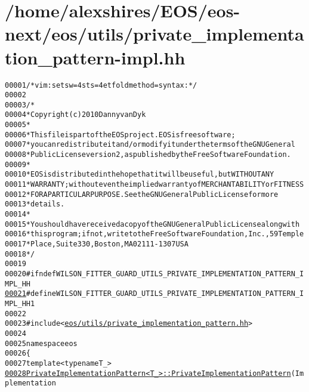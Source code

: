 \hypertarget{private__implementation__pattern-impl_8hh_source}{
\section{/home/alexshires/EOS/eos-\/next/eos/utils/private\_\-implementation\_\-pattern-\/impl.hh}
}


\begin{footnotesize}\begin{alltt}
00001 \textcolor{comment}{/* vim: set sw=4 sts=4 et foldmethod=syntax : */}
00002 
00003 \textcolor{comment}{/*}
00004 \textcolor{comment}{ * Copyright (c) 2010 Danny van Dyk}
00005 \textcolor{comment}{ *}
00006 \textcolor{comment}{ * This file is part of the EOS project. EOS is free software;}
00007 \textcolor{comment}{ * you can redistribute it and/or modify it under the terms of the GNU General}
00008 \textcolor{comment}{ * Public License version 2, as published by the Free Software Foundation.}
00009 \textcolor{comment}{ *}
00010 \textcolor{comment}{ * EOS is distributed in the hope that it will be useful, but WITHOUT ANY}
00011 \textcolor{comment}{ * WARRANTY; without even the implied warranty of MERCHANTABILITY or FITNESS}
00012 \textcolor{comment}{ * FOR A PARTICULAR PURPOSE.  See the GNU General Public License for more}
00013 \textcolor{comment}{ * details.}
00014 \textcolor{comment}{ *}
00015 \textcolor{comment}{ * You should have received a copy of the GNU General Public License along with}
00016 \textcolor{comment}{ * this program; if not, write to the Free Software Foundation, Inc., 59 Temple}
00017 \textcolor{comment}{ * Place, Suite 330, Boston, MA  02111-1307  USA}
00018 \textcolor{comment}{ */}
00019 
00020 \textcolor{preprocessor}{#ifndef WILSON\_FITTER\_GUARD\_UTILS\_PRIVATE\_IMPLEMENTATION\_PATTERN\_IMPL\_HH}
\hypertarget{private__implementation__pattern-impl_8hh_source_l00021}{}\hyperlink{private__implementation__pattern-impl_8hh_a0be835b85f475d253071ae9037d99520}{00021} \textcolor{preprocessor}{}\textcolor{preprocessor}{#define WILSON\_FITTER\_GUARD\_UTILS\_PRIVATE\_IMPLEMENTATION\_PATTERN\_IMPL\_HH 1}
00022 \textcolor{preprocessor}{}
00023 \textcolor{preprocessor}{#include <\hyperlink{private__implementation__pattern_8hh}{eos/utils/private_implementation_pattern.hh}>}
00024 
00025 \textcolor{keyword}{namespace }eos
00026 \{
00027     \textcolor{keyword}{template} <\textcolor{keyword}{typename} T\_>
\hypertarget{private__implementation__pattern-impl_8hh_source_l00028}{}\hyperlink{classeos_1_1PrivateImplementationPattern_a3e3d5f4a565256a1dda6c234b051b2f2}{00028}     \hyperlink{classeos_1_1PrivateImplementationPattern_a3e3d5f4a565256a1dda6c234b051b2f2}{PrivateImplementationPattern<T_>::PrivateImplementationPattern}(Implementation

\end{alltt}
\end{footnotesize}
